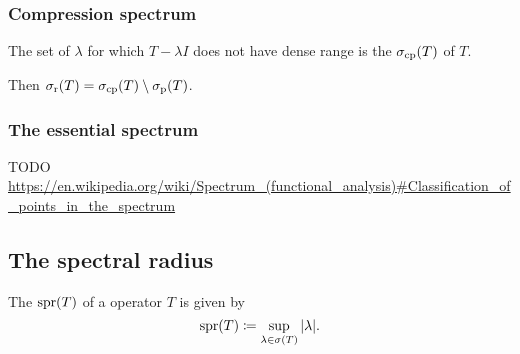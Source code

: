 \subsubsection{Compression spectrum}
\begin{definition}
The set of $\lambda$ for which $T-\lambda I$ does not have dense range is the  $\sigma_\text{cp}(T)$ of $T$.
\end{definition}
Then $\sigma_\text{r}(T) = \sigma_\text{cp}(T)\setminus\sigma_\text{p}(T)$.

\subsubsection{The essential spectrum}
TODO \url{https://en.wikipedia.org/wiki/Spectrum_(functional_analysis)#Classification_of_points_in_the_spectrum}


\subsection{The spectral radius}
\begin{definition}
The  $\operatorname{spr}(T)$ of a operator $T$ is given by
\[ \operatorname{spr}(T) \coloneqq \sup_{\lambda\in\sigma(T)}|\lambda|. \]
\end{definition}


